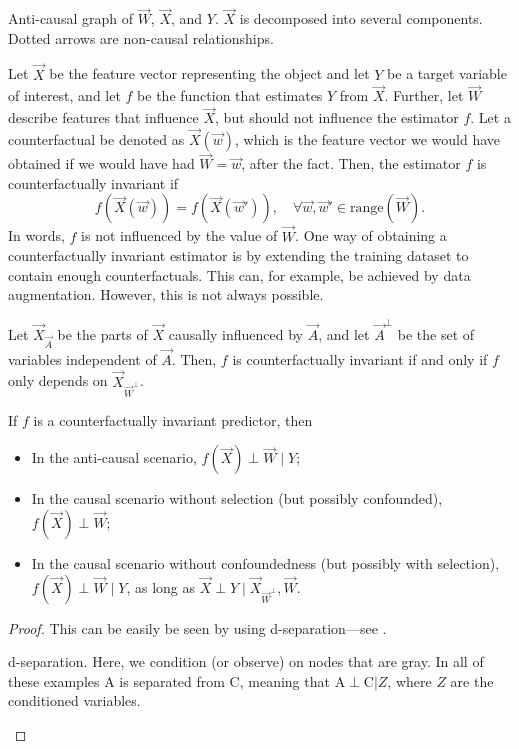 \begin{marginfigure}
    \centering
    \caption{Anti-causal graph of $\vec{W}$, $\vec{X}$, and $Y$. $\vec{X}$ is decomposed into several components. Dotted arrows are non-causal relationships.}
    \label{fig:anti-causal-graph}
\end{marginfigure}

Let $\vec{X}$ be the feature vector representing the object and let $Y$ be a target variable of
interest, and let $f$ be the function that estimates $Y$ from $\vec{X}$. Further, let $\vec{W}$
describe features that influence $\vec{X}$, but should not influence the estimator $f$. Let a
counterfactual be denoted as $\vec{X}(\vec{w})$, which is the feature vector we would have obtained
if we would have had $\vec{W} = \vec{w}$, after the fact. Then, the estimator $f$ is
counterfactually invariant if \[
    f(\vec{X}(\vec{w})) = f(\vec{X}(\vec{w}')), \quad \forall \vec{w}, \vec{w}' \in \mathrm{range}(\vec{W}).
\]
In words, $f$ is not influenced by the value of $\vec{W}$. One way of obtaining a counterfactually
invariant estimator is by extending the training dataset to contain enough counterfactuals. This
can, for example, be achieved by data augmentation. However, this is not always possible.

Let $\vec{X}_{\vec{A}}$ be the parts of $\vec{X}$ causally influenced by $\vec{A}$, and let
$\vec{A}^\perp$ be the set of variables independent of $\vec{A}$. Then, $f$ is counterfactually
invariant if and only if $f$ only depends on $\vec{X}_{\vec{W}^\perp}$.

\begin{theorem}
    If $f$ is a counterfactually invariant predictor, then
    \begin{itemize}
        \item In the anti-causal scenario, $f(\vec{X}) \perp \vec{W} \mid Y$;
        \item In the causal scenario without selection (but possibly confounded), $f(\vec{X}) \perp \vec{W}$;
        \item In the causal scenario without confoundedness (but possibly with selection), $f(\vec{X}) \perp
                  \vec{W} \mid Y$, as long as $\vec{X} \perp Y \mid \vec{X}_{\vec{W}^\perp}, \vec{W}$.
    \end{itemize}
\end{theorem}

\begin{proof}
    This can be easily be seen by using d-separation---see .

    \begin{marginfigure}
        \centering
        \caption{d-separation. Here, we condition (or observe) on nodes that are gray. In all of these examples A is separated from C, meaning that $\text{A} \perp \text{C} | Z$, where $Z$ are the conditioned variables.}
        \label{fig:d-separation}
    \end{marginfigure}
\end{proof}
